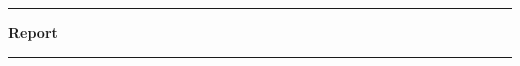 \documentclass[a4paper,11pt,titlepage,openright]{article}
\title{}
\author{}
\date{\today}
\begin{document}
  
  \begin{titlepage}
	\begin{center}
	\rule{\textwidth}{1pt}\par 
	\vspace{1\baselineskip}
	{\huge\bfseries Report }\\[0.5\baselineskip]
	\rule{\textwidth}{1pt}\par
	\end{center}
  \end{titlepage}

  \tableofcontents
  \newpage

  
  
\end{document}
